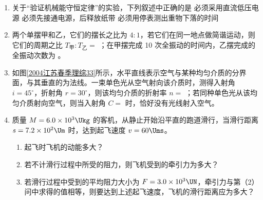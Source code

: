 \documentclass[\gkver]{gaokaozhenti}
\begin{document}
\begin{enumerate}
\item
关于“验证机械能守恒定律”的实验，下列叙述中正确的是
{必须采用直流低压电源}
{必须先接通电源，后释放纸带}
{必须用停表测出重物下落的时间}

\item
两个单摆甲和乙，它们的摆长之比为 $4:1$，若它们在同一地点做简谐运动，则它们的周期之比 $T_{\text{甲}}:T_{\text{乙}}=$ ；在甲摆完成 10 次全振动的时间内，乙摆完成的全振动次数为 。

\item
如图\ref{2004江苏春季理综33}所示，水平直线表示空气与某种均匀介质的分界面，与其垂直的为法线。一束单色光从空气射向该介质时，测得入射角 $i=45^{\circ}$，折射角 $r=30^{\circ}$，则该均匀介质的折射率 $n=$ ；若同种单色光从该均匀介质射向空气，则当入射角 $C=$  时，恰好没有光线射入空气。

\item
质量 $M=6.0\times10^{3}\Ukg$ 的客机，从静止开始沿平直的跑道滑行，当滑行距离 $s=7.2\times10^{2}\Um$ 时，达到起飞速度 $v=60\Ums$。
\begin{enumerate}
	\item
	起飞时飞机的动能多大？
	\item
	若不计滑行过程中所受的阻力，则飞机受到的牵引力为多大？
	\item
	若滑行过程中受到的平均阻力大小为 $F=3.0\times10^{3}\UN$，牵引力与第（2）问中求得的值相等，则要达到上述起飞速度，飞机的滑行距离应为多大？
\end{enumerate}
\end{enumerate}
\end{document}
